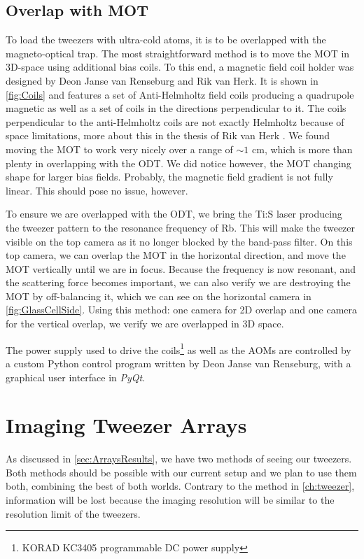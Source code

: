 \subsection{Overlap with MOT}\label{subsec:Overlap}

To load the tweezers with ultra-cold atoms, it is to be overlapped with the magneto-optical trap.
The most straightforward method is to move the MOT in 3D-space using additional bias coils.
To this end, a magnetic field coil holder was designed by Deon Janse van Renseburg and Rik van Herk. 
It is shown in \cref{fig:Coils} and features a set of Anti-Helmholtz field coils producing a quadrupole magnetic as well as a set of coils in the directions perpendicular to it.
The coils perpendicular to the anti-Helmholtz coils are not exactly Helmholtz because of space limitations, more about this in the thesis of Rik van Herk \cite{Herk2022}.
We found moving the MOT to work very nicely over a range of $\sim 1$ cm, which is more than plenty in overlapping with the \ac{ODT}.
We did notice however, the MOT changing shape for larger bias fields. 
Probably, the magnetic field gradient is not fully linear.
This should pose no issue, however.

To ensure we are overlapped with the ODT, we bring the \ac{Ti:S} laser producing the tweezer pattern to the resonance frequency of \ac{Rb}.
This will make the tweezer visible on the top camera as it no longer blocked by the band-pass filter.
On this top camera, we can overlap the \ac{MOT} in the horizontal direction, and move the MOT vertically until we are in focus. 
Because the frequency is now resonant, and the scattering force becomes important, we can also verify we are destroying the MOT by off-balancing it, which we can see on the horizontal camera in \cref{fig:GlassCellSide}.
Using this method: one camera for 2D overlap and one camera for the vertical overlap, we verify we are overlapped in 3D space. 

The power supply used to drive the coils\footnote{KORAD KC3405 programmable DC power supply} as well as the \ac{AOM}s are controlled by a custom Python control program written by Deon Janse van Renseburg, with a graphical user interface in \textit{PyQt}.


\section{Imaging Tweezer Arrays}\label{sec:TweezerImaging}

As discussed in \cref{sec:ArraysResults}, we have two methods of seeing our tweezers.
Both methods should be possible with our current setup and we plan to use them both, combining the best of both worlds.
Contrary to the method in \cref{ch:tweezer}, information will be lost because the imaging resolution will be similar to the resolution limit of the tweezers. 

